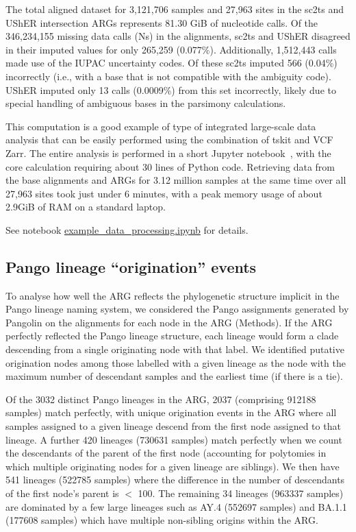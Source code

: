 \documentclass[12pt]{article}
\begin{document}
The total aligned dataset for 3,121,706 samples and 27,963 sites
in the sc2ts and UShER intersection ARGs represents
81.30 GiB of nucleotide calls.
Of the 346,234,155 missing data calls (Ns) in the alignments,
sc2ts and UShER disagreed in their imputed values for only 265,259 (0.077\%).
Additionally, 1,512,443 calls made use of the IUPAC uncertainty codes.
Of these sc2ts imputed 566 (0.04\%) incorrectly
(i.e., with a base that is not compatible with the ambiguity code).
UShER imputed only 13 calls (0.0009\%) from this set incorrectly,
likely due to special handling of
ambiguous bases in the parsimony calculations.

This computation is a good example of
type of integrated large-scale data analysis
that can be easily performed using the combination of tskit and VCF Zarr.
The entire analysis is performed in a short Jupyter
notebook~\cite{kluyver2016jupyter},
with the core calculation requiring about 30 lines of Python code.
Retrieving data from the base alignments and ARGs for 3.12 million samples
at the same time over all 27,963 sites took just under 6 minutes,
with a peak memory usage of about 2.9GiB of RAM
on a standard laptop.

See notebook
\href{https://github.com/jeromekelleher/sc2ts-paper/blob/main/notebooks/example\_data\_processing.ipynb}{example\_data\_processing.ipynb}
for details.

\subsection{Pango lineage ``origination'' events}
\label{sec:supplement_pango_lineages}

To analyse how well the ARG reflects the phylogenetic structure implicit in the
Pango lineage naming system, we considered the Pango assignments generated by
Pangolin on the alignments for each node in the ARG (Methods). If the ARG
perfectly reflected the Pango lineage structure, each lineage would form a
clade descending from a single originating node with that label. We identified
putative origination nodes among those labelled with a given lineage as the node
with the maximum number of descendant samples and the earliest time (if there
is a tie).

Of the 3032 distinct Pango lineages in the ARG, 2037 (comprising
912188 samples) match perfectly, with unique origination events in the ARG
where all samples assigned to a given lineage descend from the first node assigned
to that lineage. A further 420 lineages (730631 samples) match perfectly when we
count the descendants of the parent of the first node (accounting for
polytomies in which multiple originating nodes for a given lineage are
siblings). We then have 541 lineages (522785 samples) where the difference in
the number of descendants of the first node's parent is $<$ 100. The remaining 34
lineages (963337 samples) are dominated by a few large lineages such as AY.4
(552697 samples) and BA.1.1 (177608 samples) which have multiple non-sibling
origins within the ARG.
\end{document}
